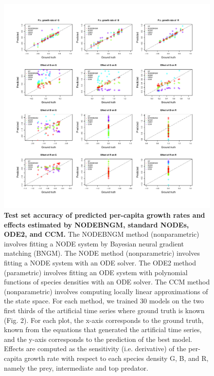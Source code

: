 \documentclass[11pt, oneside]{article}
\begin{document}
\begin{figure}[H]
\includegraphics[width=1\linewidth,page=2]{figures/figures_supplementary.pdf}
\caption{
    \textbf{Test set accuracy of predicted per-capita growth rates and effects estimated by NODEBNGM, standard NODEs, ODE2, and CCM.}
    The NODEBNGM method (nonparametric) involves fitting a NODE system by Bayesian neural gradient matching (BNGM). 
    The NODE method (nonparametric) involves fitting a NODE system with an ODE solver. 
    The ODE2 method (parametric) involves fitting an ODE system with polynomial functions of species densities with an ODE solver. 
    The CCM method (nonparametric) involves computing locally linear approximations of the state space. 
    For each method, we trained 30 models on the two first thirds of the artificial time series where ground truth is known (Fig. 2). 
    For each plot, the x-axis corresponds to the ground truth, known from the equations that generated the artificial time series, and the y-axis corresponds to the prediction of the best model. 
    Effects are computed as the sensitivity (i.e. derivative) of the per-capita growth rate with respect to each species density G, B, and R, namely the prey, intermediate and top predator.
}
\end{figure}
\newpage
\end{document}
